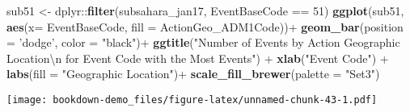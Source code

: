 \documentclass[]{book}
\newenvironment{Shaded}{\begin{snugshade}}{\end{snugshade}}
\newcommand{\KeywordTok}[1]{\textcolor[rgb]{0.13,0.29,0.53}{\textbf{{#1}}}}
\newcommand{\DataTypeTok}[1]{\textcolor[rgb]{0.13,0.29,0.53}{{#1}}}
\newcommand{\DecValTok}[1]{\textcolor[rgb]{0.00,0.00,0.81}{{#1}}}
\newcommand{\CharTok}[1]{\textcolor[rgb]{0.31,0.60,0.02}{{#1}}}
\newcommand{\StringTok}[1]{\textcolor[rgb]{0.31,0.60,0.02}{{#1}}}
\newcommand{\NormalTok}[1]{{#1}}
\theoremstyle{definition}
\theoremstyle{definition}
\theoremstyle{remark}
\begin{document}
\begin{Shaded}
\begin{Highlighting}[]
\NormalTok{sub51 <-}\StringTok{ }\NormalTok{dplyr::}\KeywordTok{filter}\NormalTok{(subsahara_jan17, EventBaseCode ==}\StringTok{ }\DecValTok{51}\NormalTok{)}
\KeywordTok{ggplot}\NormalTok{(sub51, }\KeywordTok{aes}\NormalTok{(}\DataTypeTok{x=} \NormalTok{EventBaseCode, }\DataTypeTok{fill =} \NormalTok{ActionGeo_ADM1Code))+}
\StringTok{  }\KeywordTok{geom_bar}\NormalTok{(}\DataTypeTok{position =} \StringTok{'dodge'}\NormalTok{, }\DataTypeTok{color =} \StringTok{"black"}\NormalTok{)+}
\StringTok{  }\KeywordTok{ggtitle}\NormalTok{(}\StringTok{"Number of Events by Action Geographic Location}\CharTok{\textbackslash{}n}\StringTok{ for Event Code with the Most Events"}\NormalTok{) +}
\StringTok{  }\KeywordTok{xlab}\NormalTok{(}\StringTok{"Event Code"}\NormalTok{) +}
\StringTok{  }\KeywordTok{labs}\NormalTok{(}\DataTypeTok{fill =} \StringTok{"Geographic Location"}\NormalTok{)+}
\StringTok{  }\KeywordTok{scale_fill_brewer}\NormalTok{(}\DataTypeTok{palette =} \StringTok{"Set3"}\NormalTok{)}
\end{Highlighting}
\end{Shaded}

\texttt{[image: bookdown-demo\_files/figure-latex/unnamed-chunk-43-1.pdf]}
\end{document}
